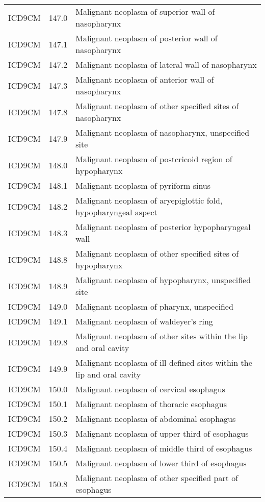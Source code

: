 \begin{longtable}{p{}p{}p{}}
  ICD9CM & 147.0 & Malignant neoplasm of superior wall of nasopharynx \\ 
  ICD9CM & 147.1 & Malignant neoplasm of posterior wall of nasopharynx \\ 
  ICD9CM & 147.2 & Malignant neoplasm of lateral wall of nasopharynx \\ 
  ICD9CM & 147.3 & Malignant neoplasm of anterior wall of nasopharynx \\ 
  ICD9CM & 147.8 & Malignant neoplasm of other specified sites of nasopharynx \\ 
  ICD9CM & 147.9 & Malignant neoplasm of nasopharynx, unspecified site \\ 
  ICD9CM & 148.0 & Malignant neoplasm of postcricoid region of hypopharynx \\ 
  ICD9CM & 148.1 & Malignant neoplasm of pyriform sinus \\ 
  ICD9CM & 148.2 & Malignant neoplasm of aryepiglottic fold, hypopharyngeal aspect \\ 
  ICD9CM & 148.3 & Malignant neoplasm of posterior hypopharyngeal wall \\ 
  ICD9CM & 148.8 & Malignant neoplasm of other specified sites of hypopharynx \\ 
  ICD9CM & 148.9 & Malignant neoplasm of hypopharynx, unspecified site \\ 
  ICD9CM & 149.0 & Malignant neoplasm of pharynx, unspecified \\ 
  ICD9CM & 149.1 & Malignant neoplasm of waldeyer's ring \\ 
  ICD9CM & 149.8 & Malignant neoplasm of other sites within the lip and oral cavity \\ 
  ICD9CM & 149.9 & Malignant neoplasm of ill-defined sites within the lip and oral cavity \\ 
  ICD9CM & 150.0 & Malignant neoplasm of cervical esophagus \\ 
  ICD9CM & 150.1 & Malignant neoplasm of thoracic esophagus \\ 
  ICD9CM & 150.2 & Malignant neoplasm of abdominal esophagus \\ 
  ICD9CM & 150.3 & Malignant neoplasm of upper third of esophagus \\ 
  ICD9CM & 150.4 & Malignant neoplasm of middle third of esophagus \\ 
  ICD9CM & 150.5 & Malignant neoplasm of lower third of esophagus \\ 
  ICD9CM & 150.8 & Malignant neoplasm of other specified part of esophagus \\ 

\end{longtable}
